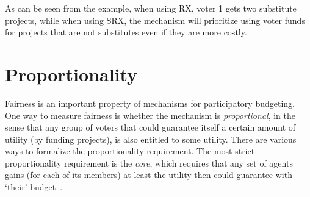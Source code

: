 \documentclass[runningheads]{llncs}
\begin{document}
\begin{example}
\begin{enumerate}
    
\end{enumerate}
\end{example}

As can be seen from the example,  when using  RX, voter 1 gets two substitute projects, while when using SRX, the mechanism will prioritize using voter funds for projects that are not substitutes  even if they are more costly.



\section{Proportionality}
\label{sec:prop}
Fairness is an important property of mechanisms for   participatory budgeting. One way to measure fairness is whether the mechanism is  \emph{proportional}, in the sense that any group of voters that could guarantee   itself a certain amount of utility (by funding  projects), is also entitled to some utility.
There are various ways to formalize the proportionality requirement. The most strict proportionality requirement is the \emph{core}, which requires that any set of agents gains (for each of its members) at least the utility then could guarantee with `their' budget~\cite{fain2016core, fain2018fair}. %
\end{document}
